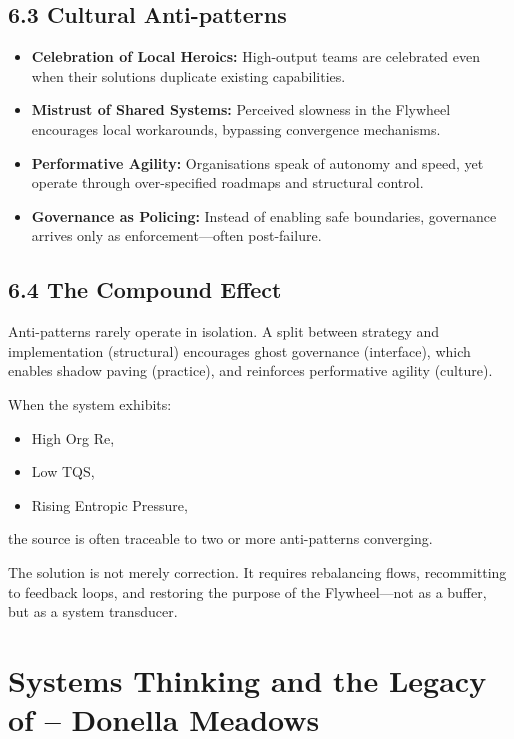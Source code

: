 \documentclass[12pt]{article}
\begin{document}
\subsection*{6.3 Cultural Anti-patterns}

\begin{itemize}
    \item \textbf{Celebration of Local Heroics:} High-output teams are celebrated even when their solutions duplicate existing capabilities.
    
    \item \textbf{Mistrust of Shared Systems:} Perceived slowness in the Flywheel encourages local workarounds, bypassing convergence mechanisms.
    
    \item \textbf{Performative Agility:} Organisations speak of autonomy and speed, yet operate through over-specified roadmaps and structural control.
    
    \item \textbf{Governance as Policing:} Instead of enabling safe boundaries, governance arrives only as enforcement---often post-failure.
\end{itemize}

\subsection*{6.4 The Compound Effect}

Anti-patterns rarely operate in isolation. A split between strategy and implementation (structural) encourages ghost governance (interface), which enables shadow paving (practice), and reinforces performative agility (culture).

When the system exhibits:
\begin{itemize}
    \item High Org Re,
    \item Low TQS,
    \item Rising Entropic Pressure,
\end{itemize}
the source is often traceable to two or more anti-patterns converging.

The solution is not merely correction. It requires rebalancing flows, recommitting to feedback loops, and restoring the purpose of the Flywheel---not as a buffer, but as a system transducer.

\section{Systems Thinking and the Legacy of -- Donella Meadows}
\end{document}

